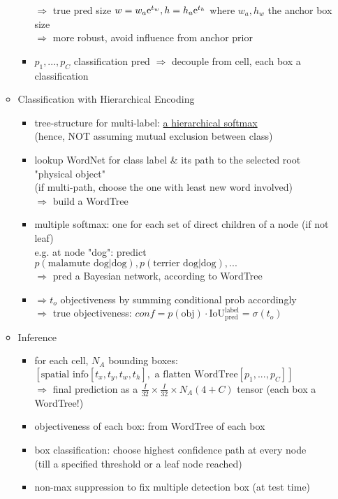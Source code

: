 \begin{itemize}
\begin{itemize}
\begin{itemize}
		$\Rightarrow$ true pred size $w=w_a{\rm e}^{t_w}, h=h_a{\rm e}^{t_h}$ where $w_a,h_w$ the anchor box size \\
		$\Rightarrow$ more robust, avoid influence from anchor prior
		\item $p_1,...,p_C$ classification pred $\Rightarrow$ decouple from cell, each box a classification
		\end{itemize}
	\item Classification with Hierarchical Encoding
		\begin{itemize}
		\item tree-structure for multi-label: \hyperref[DL_Layers_Hisoftmax]{a hierarchical softmax} \\ 
		(hence, NOT assuming mutual exclusion between class)
		\item lookup WordNet for class label \& its path to the selected root "physical object" \\
		(if multi-path, choose the one with least new word involved) \\
		$\Rightarrow$ build a WordTree
		\item multiple softmax: one for each set of direct children of a node (if not leaf) \\
		e.g. at node "dog": predict $p(\text{malamute dog}|\text{dog}), p(\text{terrier dog}|\text{dog}), ...$ \\
		$\Rightarrow$ pred a Bayesian network, according to WordTree
		\item $\Rightarrow t_o$ objectiveness by summing conditional prob accordingly \\
		$\Rightarrow$ true objectiveness: $conf = p(\text{obj})\cdot \text{IoU}^\text{label}_\text{pred} = \sigma (t_o)$
		\end{itemize}
	\item Inference
		\begin{itemize}
		\item for each cell, $N_A$ bounding boxes: $[\text{spatial info}[t_x, t_y, t_w, t_h], \text{ a flatten WordTree}[p_1,...,p_C]]$ \\
		$\Rightarrow$ final prediction as a $\frac I{32} \times \frac I{32} \times N_A(4+C)$ tensor (each box a WordTree!)
		\item objectiveness of each box: from WordTree of each box
		\item box classification: choose highest confidence path at every node \\ 
		(till a specified threshold or a leaf node reached)
		\item non-max suppression to fix multiple detection box (at test time)

\end{itemize}
\end{itemize}
\end{itemize}
